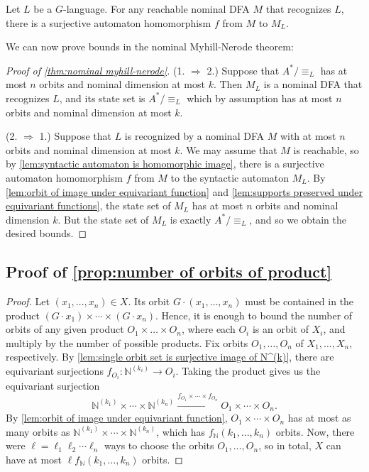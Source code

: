 \documentclass[runningheads]{llncs}
\newcommand{\bb}{\mathbb}
\begin{document}
\begin{lemma} \label{lem:syntactic automaton is homomorphic image}
    Let $L$ be a $G$-language.
    For any reachable nominal DFA $M$ that recognizes $L$, there is a surjective automaton homomorphism $f$ from $M$ to $M_L$.
\end{lemma}

We can now prove bounds in the nominal Myhill-Nerode theorem:

\begin{proof}[Proof of \autoref{thm:nominal myhill-nerode}]
    (1. $\Rightarrow$ 2.) Suppose that $A^* / \equiv_L$ has at most $n$ orbits and nominal dimension at most $k$.
    Then $M_L$ is a nominal DFA that recognizes $L$, and its state set is $A^* / \equiv_L$ which by assumption has at most $n$ orbits and nominal dimension at most $k$.

    (2. $\Rightarrow$ 1.) Suppose that $L$ is recognized by a nominal DFA $M$ with at most $n$ orbits and nominal dimension at most $k$. 
    We may assume that $M$ is reachable, so by \autoref{lem:syntactic automaton is homomorphic image}, there is a surjective automaton homomorphism $f$ from $M$ to the syntactic automaton $M_L$. 
    By \autoref{lem:orbit of image under equivariant function} and \autoref{lem:supports preserved under equivariant functions}, the state set of $M_L$ has at most $n$ orbits and nominal dimension $k$. 
    But the state set of $M_L$ is exactly $A^* / \equiv_L$, and so we obtain the desired bounds.
\end{proof}


\subsection{Proof of \autoref{prop:number of orbits of product}} \label{appendix:proof of number of orbits of product}

\begin{proof}
    Let $(x_1, \ldots, x_n) \in X$.
    Its orbit $G \cdot (x_1, \ldots, x_n)$ must be contained in the product $(G \cdot x_1) \times \cdots \times (G \cdot x_n)$.
    Hence, it is enough to bound the number of orbits of any given product $O_1 \times \ldots \times O_n$, where each $O_i$ is an orbit of $X_i$, and multiply by the number of possible products.
    Fix orbits $O_1, \ldots, O_n$ of $X_1, \ldots, X_n$, respectively. 
    By \autoref{lem:single orbit set is surjective image of N^(k)}, there are equivariant surjections $f_{O_i} : \bb N^{(k_i)} \to O_i$. 
    Taking the product gives us the equivariant surjection
    \[
        \bb N^{(k_1)} \times \cdots \times \bb N^{(k_n)} \xrightarrow{f_{O_1} \times \cdots \times f_{O_n}} O_1 \times \cdots \times O_n.
    \]
    By \autoref{lem:orbit of image under equivariant function}, $O_1 \times \cdots \times O_n$ has at most as many orbits as $\bb N^{(k_1)} \times \cdots \times \bb N^{(k_n)}$, which has $f_{\bb N}(k_1, \ldots, k_n)$ orbits.
    Now, there were $\ell = \ell_1 \ell_2 \cdots \ell_n$ ways to choose the orbits $O_1, \ldots, O_n$, so in total, $X$ can have at most $\ell f_{\bb N}(k_1, \ldots, k_n)$ orbits.
\end{proof}
\end{document}
